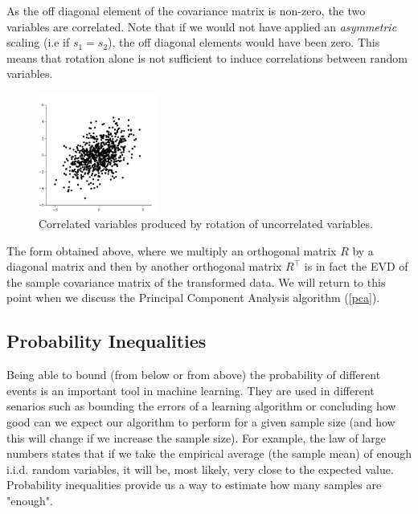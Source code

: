 As the off diagonal element of the covariance matrix is non-zero, the two variables are correlated. Note that if we would not have applied an \emph{asymmetric} scaling (i.e if $s_1=s_2$), the off diagonal elements would have been zero. This means that rotation alone is not sufficient to induce correlations between random variables.

\begin{figure}[h!]
	\centering
	\includegraphics[width=0.35\textwidth]{chapters/mathematical.basis/figures/correlated_cov.png}
	\caption{Correlated variables produced by rotation of uncorrelated variables. \GitChapterOneExamples}
	\label{rotated_cov}
\end{figure}

\begin{remark}
The form obtained above, where we multiply an orthogonal matrix $R$ by a diagonal matrix and then by another orthogonal matrix $R^\top$ is in fact the EVD of the sample covariance matrix of the transformed data. We will return to this point when we discuss the Principal Component Analysis algorithm (\ref{pca}).
\end{remark}



\subsection{Probability Inequalities}
Being able to bound (from below or from above) the probability of different events is an important tool in machine learning. They are used in different senarios such as bounding the errors of a learning algorithm or concluding how good can we expect our algorithm to perform for a given sample size (and how this will change if we increase the sample size). For example, the law of large numbers states that if we take the empirical average (the sample mean) of enough i.i.d. random variables, it will be, most likely, very close to the expected value. Probability inequalities provide us a way to estimate how many samples are "enough".

